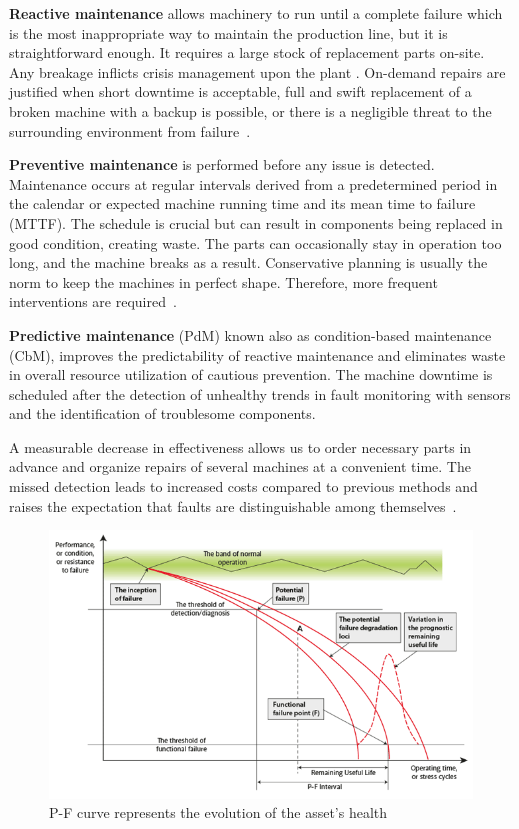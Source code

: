 \textbf{Reactive maintenance} allows machinery to run until a complete failure which is the most inappropriate way to maintain the production line, but it is straightforward enough. It requires a large stock of replacement parts on-site. Any breakage inflicts crisis management upon the plant \cite{scheffer_practical_2004}. On-demand repairs are justified when short downtime is acceptable, full and swift replacement of a broken machine with a backup is possible, or there is a negligible threat to the surrounding environment from failure~\cite{ziaran_technicka_2013}.

\textbf{Preventive maintenance} is performed before any issue is detected. Maintenance occurs at regular intervals derived from a predetermined period in the calendar or expected machine running time and its mean time to failure (MTTF). The schedule is crucial but can result in components being replaced in good condition, creating waste. The parts can occasionally stay in operation too long, and the machine breaks as a result. Conservative planning is usually the norm to keep the machines in perfect shape. Therefore, more frequent interventions are required~\cite{mohanty_machinery_2015}.

\textbf{Predictive maintenance} (PdM) known also as condition-based maintenance (CbM), improves the predictability of reactive maintenance and eliminates waste in overall resource utilization of cautious prevention. The machine downtime is scheduled after the detection of unhealthy trends in fault monitoring with sensors and the identification of troublesome components.

A measurable decrease in effectiveness allows us to order necessary parts in advance and organize repairs of several machines at a convenient time. The missed detection leads to increased costs compared to previous methods and raises the expectation that faults are distinguishable among themselves~\cite{davies_handbook_2012}.

\begin{figure}[ht]
	\centering
	\includegraphics[width=\textwidth]{assets/analysis/P-F-Curve.png}
	\caption{P-F curve represents the evolution of the asset's health~\cite{jennions_integrated_2011}}
	\label{fig:p-f-curve}
\end{figure}


